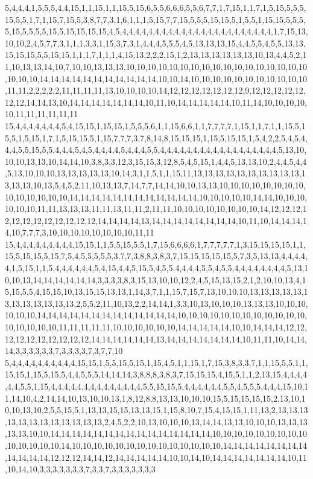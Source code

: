 5,4,4,4,1,5,5,5,4,4,15,1,1,15,1,1,15,5,15,6,5,5,6,6,6,5,5,6,7,7,1,7,15,1,1,7,1,5,15,5,5,5,15,5,5,1,7,1,15,7,15,5,3,8,7,7,3,1,6,1,1,1,5,15,7,7,15,5,5,5,15,15,5,1,5,5,1,15,15,5,5,5,5,15,5,5,5,5,15,5,15,15,15,15,4,5,4,4,4,4,4,4,4,4,4,4,4,4,4,4,4,4,4,4,4,4,4,4,4,1,7,15,13,10,10,2,4,5,7,7,3,1,1,1,3,3,1,15,3,7,3,1,4,4,4,5,5,5,4,5,13,13,13,15,4,4,5,5,4,5,5,13,13,15,15,15,5,5,15,15,1,1,1,7,1,1,1,4,15,13,2,2,2,15,1,2,13,13,13,13,13,13,10,13,4,4,5,2,11,10,13,13,14,10,7,10,10,13,13,13,10,10,10,10,10,10,10,10,10,10,10,10,10,10,10,10,10,10,10,10,14,14,14,14,14,14,14,14,14,14,14,10,10,14,10,10,10,10,10,10,10,10,10,10,10,11,11,2,2,2,2,2,11,11,11,11,13,10,10,10,10,14,12,12,12,12,12,12,12,9,12,12,12,12,12,12,12,14,14,13,10,14,14,14,14,14,14,14,10,11,10,14,14,14,14,14,10,11,14,10,10,10,10,10,11,11,11,11,11,11
15,4,4,4,4,4,4,4,5,4,15,15,1,15,15,1,5,5,5,6,1,1,15,6,6,1,1,7,7,7,7,1,15,1,1,7,1,1,15,5,15,5,1,5,15,1,7,1,5,15,15,5,1,15,7,7,7,3,7,8,14,8,15,15,15,1,15,5,15,15,1,5,4,2,2,5,4,5,4,4,4,5,5,15,5,5,4,4,4,5,4,5,4,4,4,4,5,4,4,4,5,5,4,4,4,4,4,4,4,4,4,4,4,4,4,4,4,4,4,4,5,13,10,10,10,13,13,10,14,14,10,3,8,3,3,12,3,15,15,3,12,8,5,4,5,15,1,4,4,5,13,13,10,2,4,4,5,4,4,5,13,10,10,10,13,13,13,13,13,10,14,3,1,1,5,1,1,15,11,13,13,13,13,13,13,13,13,13,13,13,13,13,10,13,5,4,5,2,11,10,13,13,7,14,7,7,14,14,10,10,13,13,10,10,10,10,10,10,10,10,10,10,10,10,10,10,14,14,14,14,14,14,14,14,14,14,14,14,10,10,10,10,10,14,14,10,10,10,10,10,10,11,11,13,13,13,11,11,13,11,11,2,11,11,10,10,10,10,10,10,10,10,14,12,12,12,12,12,12,12,12,12,12,12,12,14,14,14,14,13,14,14,14,14,14,14,14,14,10,11,10,14,14,14,14,10,7,7,7,3,10,10,10,10,10,10,10,10,11,11
15,4,4,4,4,4,4,4,4,4,15,15,1,1,5,5,15,5,5,1,7,15,6,6,6,6,1,7,7,7,7,7,1,3,15,15,15,15,1,1,15,5,15,15,5,15,7,5,4,5,5,5,5,5,3,7,7,3,8,8,3,8,3,7,15,15,15,15,15,5,7,3,5,13,13,4,4,4,4,4,1,5,15,1,1,5,4,4,4,4,4,4,5,4,15,4,4,5,15,5,4,5,5,4,4,4,4,5,5,4,5,5,4,4,4,4,4,4,4,4,5,13,10,10,13,14,14,14,14,14,14,3,3,3,3,8,3,15,13,10,10,12,2,4,5,15,13,15,2,1,2,10,10,13,4,15,15,5,5,4,15,15,10,13,15,15,13,13,1,14,3,7,1,1,15,7,15,7,13,10,10,10,13,13,13,13,13,13,13,13,13,13,13,13,2,5,5,2,11,10,13,2,2,14,14,1,3,3,10,13,10,10,10,13,13,13,10,10,10,10,10,10,14,14,14,14,14,14,14,14,14,14,14,14,14,10,10,10,10,10,10,10,10,10,10,10,10,10,10,10,10,10,11,11,11,11,11,10,10,10,10,10,10,14,14,14,14,14,10,10,14,14,14,12,12,12,12,12,12,12,12,12,12,14,14,14,14,14,14,13,14,14,14,14,14,14,14,10,11,11,10,14,14,14,3,3,3,3,3,3,7,3,3,3,3,7,3,7,7,10
5,4,4,4,4,4,4,4,4,4,4,15,15,1,5,5,15,5,15,1,15,4,5,1,1,15,1,7,15,3,8,3,3,7,1,1,15,5,5,1,1,15,15,1,15,5,15,5,4,4,5,5,5,14,14,14,3,8,8,8,3,8,3,7,15,15,15,4,15,5,1,1,2,13,15,4,4,4,4,4,4,5,5,1,15,4,4,4,4,4,4,4,4,4,4,4,4,4,4,5,5,15,15,5,4,4,4,4,4,4,5,5,4,5,5,5,4,4,4,15,10,11,14,10,4,2,14,14,10,13,10,10,13,1,8,12,8,8,13,13,10,10,10,15,5,15,15,15,15,2,13,10,10,10,13,10,2,5,5,15,5,1,13,13,15,15,13,13,15,1,15,8,10,7,15,4,15,15,1,11,13,2,13,13,13,13,13,13,13,13,13,13,13,13,2,4,5,2,2,10,13,10,10,10,13,14,14,13,13,10,10,10,13,13,13,13,13,10,10,14,14,14,14,14,14,14,14,14,14,14,14,14,14,14,10,10,10,10,10,10,10,10,10,10,10,10,10,10,14,10,10,10,10,10,10,10,10,10,10,10,10,10,10,14,14,14,14,14,14,14,14,14,14,14,14,12,12,12,14,14,12,14,14,14,14,14,10,10,14,10,14,14,14,14,14,14,14,10,11,10,14,10,3,3,3,3,3,3,3,7,3,3,7,3,3,3,3,3,3,3
